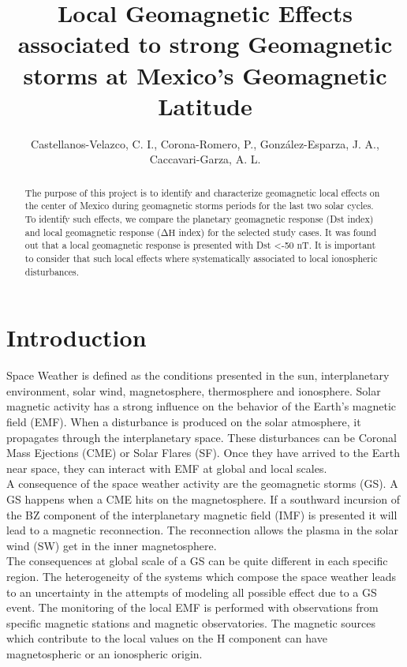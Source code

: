 \documentclass[a4paper, 11pt]{article}
\title{Local Geomagnetic Effects associated to strong Geomagnetic storms at Mexico’s Geomagnetic Latitude }
\author{Castellanos-Velazco, C. I., Corona-Romero, P., González-Esparza, J. A., Caccavari-Garza, A. L.}
\date{}
\begin{document}
\maketitle  
\begin{abstract}
The purpose of this project is to identify and characterize geomagnetic local effects on the center of Mexico during geomagnetic storms periods for the last two solar cycles. To identify such effects, we compare the planetary geomagnetic response (Dst index) and local geomagnetic response ($\mathrm{\Delta H}$ index) for the selected study cases. It was found out that a local geomagnetic response is presented  with Dst <-50 nT. It is important to consider that such local effects where systematically associated to local ionospheric disturbances.\\


\end{abstract}

\section*{Introduction}

Space Weather is defined as the conditions presented in the sun, interplanetary environment, solar wind,  magnetosphere, thermosphere and ionosphere. Solar magnetic activity has a strong influence on the behavior of the Earth’s magnetic field (EMF). When a disturbance is produced on the solar atmosphere, it propagates through the interplanetary space. These disturbances can be Coronal Mass Ejections (CME) or Solar Flares (SF). Once they have arrived to the Earth near space, they can interact with EMF at global and local scales.\\  

A consequence of the space weather activity are the geomagnetic storms (GS). A GS happens when a CME hits on the magnetosphere. If a southward incursion of the BZ component of the interplanetary magnetic field (IMF) is presented it will lead to a magnetic reconnection. The reconnection allows the plasma in the solar wind (SW) get in the inner magnetosphere.\\  

The consequences at global scale of a GS can be quite different in each specific region. The heterogeneity of the systems which compose the space weather leads to an uncertainty in the attempts of modeling all possible effect due to a GS event. The monitoring of the local EMF is performed with observations from specific magnetic stations and magnetic observatories. The magnetic sources which contribute to the local values on the H component can have magnetospheric or an ionospheric origin.\\ 
\end{document}
